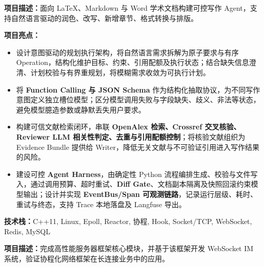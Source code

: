 \textbf{项目描述：}面向 LaTeX、Markdown 与 Word 学术文档构建可控写作 Agent，支持自然语言驱动的润色、改写、新增章节、格式转换与排版。

\textbf{项目亮点：}
\begin{itemize}
	\item 设计意图驱动的规划执行架构，将自然语言需求拆解为原子要求与有序 Operation，结构化维护目标、约束、引用配额及执行状态；结合缺失信息澄清、计划校验与有界重规划，将模糊需求收敛为可执行计划。
	\item 将 \textbf{Function Calling 与 JSON Schema} 作为结构化抽取协议，为不同写作意图定义独立槽位模型；区分模型调用失败与字段缺失、歧义、非法等状态，避免模型臆造参数或静默丢失用户要求。
	\item 构建可信文献检索闭环，串联 \textbf{OpenAlex 检索、Crossref 交叉核验、Reviewer LLM 相关性判定、去重与引用配额控制}；将核验文献组织为 Evidence Bundle 提供给 Writer，降低无关文献与不可验证引用进入写作结果的风险。
	\item 建设可控 \textbf{Agent Harness}，由确定性 Python 流程编排生成、校验与文件写入，通过调用预算、超时重试、\textbf{Diff Gate}、文档副本隔离及快照回滚约束模型输出；设计并实现 \textbf{EventBus/Span 可观测链路}，记录运行层级、耗时、重试与终态，支持 Trace 本地落盘及 Langfuse 导出。
\end{itemize}


\newpage
{}
\textbf{技术栈：}C++11, Linux, Epoll, Reactor, 协程, Hook, Socket/TCP, WebSocket, Redis, MySQL

\textbf{项目描述：}完成高性能服务器框架核心模块，并基于该框架开发 WebSocket IM 系统，验证协程化网络框架在长连接业务中的应用。

